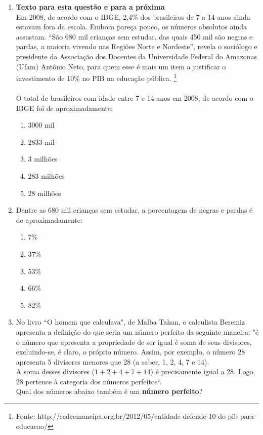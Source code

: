 \documentclass[10pt,a4paper]{article}
\begin{document}
\begin{multicols}{2}


	

\begin{enumerate}

	\item \textbf{Texto para esta quest\~{a}o e para a pr\'oxima}\\
	Em 2008, de acordo com o IBGE, 2,4\% dos brasileiros de 7 a 14 anos ainda estavam fora da escola. Embora pare\c{c}a pouco, os n\'umeros absolutos ainda assustam. “S\~{a}o 680 mil crian\c{c}as sem estudar, das quais 450 mil s\~{a}o negras e pardas, a maioria vivendo nas Regi\~{o}es Norte e Nordeste”, revela o soci\'ologo e presidente da Associa\c{c}\~{a}o dos Docentes da Universidade Federal do Amazonas (Ufam) Antônio Neto, para quem esse \'e mais um item a justificar o investimento de 10\% no PIB na educa\c{c}\~{a}o p\'ublica. \footnote{Fonte: http://redeemancipa.org.br/2012/05/entidade-defende-10-do-pib-para-educacao/} \\ \\
O total de brasileiros com idade entre 7 e 14 anos em 2008, de acordo com o IBGE foi de aproximadamente:
		\begin{enumerate}
		\item 3000 mil
		\item 2833 mil
		\item 3 milh\~{o}es
		\item 283 milh\~{o}es
		\item 28 milh\~{o}es
		\end{enumerate}

	\item Dentre as 680 mil crian\c{c}as sem estudar, a porcentagem de negras e pardas \'e de aproximadamente:

		\begin{enumerate}
		\item 7\%
		\item 37\%
		\item 53\%
		\item 66\%
		\item 82\%
		\end{enumerate}

	\item No livro ``O homem que calculava", de Malba Tahan, o calculista Beremiz apresenta a defini\c{c}\~{a}o do que seria um n\'umero perfeito da seguinte maneira: "\'e o n\'umero que apresenta a propriedade de ser igual \'e soma de seus divisores, excluindo-se, \'e claro, o pr\'oprio n\'umero. Assim, por exemplo, o n\'umero 28 apresenta 5 divisores menores que 28 (a saber, 1, 2, 4, 7 e 14). \\
	A soma desses divisores ($1+2+4+7+14$) \'e precisamente igual a 28. Logo, 28 pertence \`a  categoria dos n\'umeros perfeitos``. \\
	Qual dos n\'umeros abaixo tamb\'em \'e um \textbf{n\'umero perfeito}?


\end{enumerate}
\end{multicols}
\end{document}
